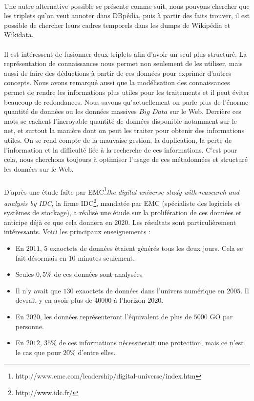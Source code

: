 \paragraph{}
Une autre alternative possible se présente comme suit, nous pouvons chercher que les triplets qu'on veut annoter dans DBpédia, puis à partir des faits trouver, il est possible de chercher leurs cadres temporels dans les dumps de Wikipédia et Wikidata.
\paragraph{}
Il est intéressent de fusionner deux triplets afin d'avoir un seul plus structuré. La représentation de connaissances nous permet non seulement de les utiliser, mais aussi de faire des déductions à partir de ces données pour exprimer d'autres concepts. Nous avons remarqué aussi que la modélisation des connaissances permet de rendre les informations plus utiles pour les traitements et il peut éviter beaucoup de redondances. Nous savons qu'actuellement on parle plus de l'énorme quantité de données ou les données massives $Big$ $Data$ sur le Web. Derrière ces mots se cachent l’incroyable quantité de données disponible notamment sur le net, et surtout la manière dont on peut les traiter pour obtenir des informations utiles. On se rend compte de la mauvaise gestion, la duplication, la perte de l'information et la difficulté liée à la recherche de ces informations. C'est pour cela, nous cherchons toujours à optimiser l'usage de ces métadonnées et structuré les données sur le Web.
\subparagraph{}
D'après une étude faite par EMC\footnote{http://www.emc.com/leadership/digital-universe/index.htm}{\it the digital universe study with  reasearch and analysis by IDC}, la firme IDC\footnote{http://www.idc.fr/}, mandatée par EMC (spécialiste des logiciels et systèmes de stockage), a réalisé une étude sur la prolifération de ces données et anticipe déjà ce que cela donnera en $2020$. Les résultats sont particulièrement intéressants. Voici les principaux enseignements :
\begin{itemize}
\item En $2011$, $5$ exaoctets de données étaient générés tous les deux jours. Cela se fait désormais en $10$ minutes seulement.
\item Seules $0,5$\% de ces données sont analysées
\item Il n’y avait que $130$ exaoctets de données dans l’univers numérique en $2005$. Il devrait y en avoir plus de $40 000$ à l’horizon $2020$.
\item En $2020$, les données représenteront l’équivalent de plus de $5 000$ GO par personne.
\item En $2012$, $35$\% de ces informations nécessiterait une protection, mais ce n’est le cas que pour $20$\% d’entre elles.
\end{itemize}
